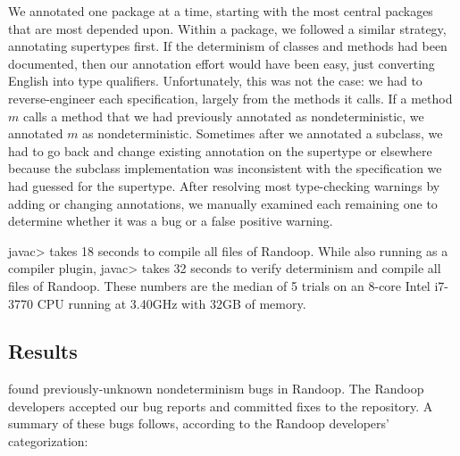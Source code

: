 We annotated one package at a time, starting with the most central packages
that are most depended upon.  Within a package, we followed a similar
strategy, annotating supertypes first.  If the determinism of classes and methods had been
documented, then our annotation effort
would have been easy, just converting English into type qualifiers.
Unfortunately, this was not the case: we had to reverse-engineer each
specification, largely from the methods it calls.  If a method $m$ calls a
method that we had previously annotated as nondeterministic, we annotated
$m$ as nondeterministic.
Sometimes after we
annotated a subclass, we had to go back and change existing annotation on
the supertype or elsewhere because the subclass implementation was
inconsistent with the specification we had guessed for the supertype.
After resolving most type-checking warnings by adding or changing
annotations, we manually examined each remaining one to determine whether
it was a bug or a false positive warning.

\<javac> takes 18 seconds to compile all files of Randoop.
While also running \theDeterminismChecker as a compiler plugin, \<javac> takes 32 seconds to verify determinism and compile all files of Randoop.
These numbers are the median of 5 trials on an 8-core Intel i7-3770 CPU running at 3.40GHz with 
32GB of memory.


\subsection{Results}

\TheDeterminismChecker found \numRandoopBugs previously-unknown nondeterminism bugs in Randoop.
The Randoop developers accepted our bug reports and committed fixes to the repository. A summary
of these bugs follows, according to the Randoop developers' categorization:

